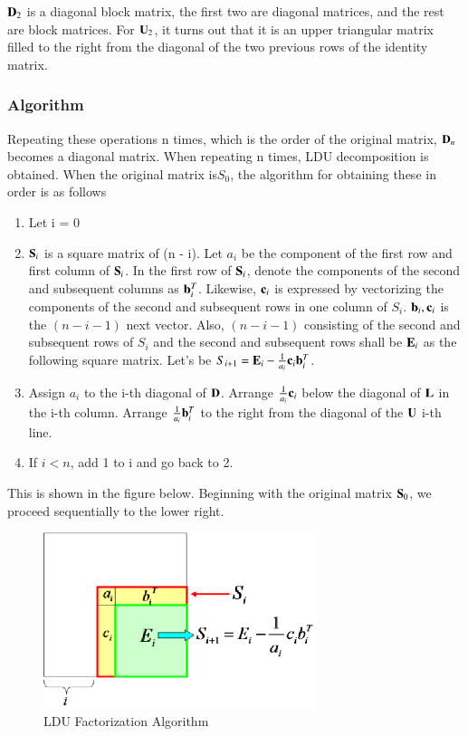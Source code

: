 $\mathbf{D}_2$ is a diagonal block matrix, the first two are diagonal matrices, and the rest are block matrices. For $\mathbf{U}_2$, it turns out that it is an upper triangular matrix filled to the right from the diagonal of the two previous rows of the identity matrix.

\subsubsection{Algorithm}

Repeating these operations n times, which is the order of the original matrix, $\mathbf{D}_n$ becomes a diagonal matrix. When repeating n times, LDU decomposition is obtained.
When the original matrix is ​​$S_0$, the algorithm for obtaining these in order is as follows

\begin {enumerate}
\item Let i = 0
\item $\mathbf{S}_i$ is a square matrix of (n - i). 
%
Let $a_i$ be the component of the first row and first column of $\mathbf{S}_i$. 
%
In the first row of $\mathbf{S}_i$, denote the components of the second and subsequent columns as $\mathbf{b}^T_i$. 
%
Likewise, $\mathbf{c}_i$ is expressed by vectorizing the components of the second and subsequent rows in one column of $S_i$. $\mathbf{b}_i,\mathbf{c}_i$ is the $(n-i-1)$ next vector. 
%
Also, $(n-i-1)$ consisting of the second and subsequent rows of $S_i$ and the second and subsequent rows shall be $\mathbf{E}_i$ as the following square matrix. 
%
Let's be $S_{i+1} = \mathbf{E}_i - \frac{1}{a_i}\mathbf{c}_i\mathbf{b}^T_i$.
\item Assign $a_i$ to the i-th diagonal of $\mathbf{D}$. 
%
Arrange $\frac{1}{a_i}\mathbf{c}_i$ below the diagonal of $\mathbf{L}$ in the i-th column. 
%
Arrange $\frac{1}{a_i}\mathbf{b}^T_i$ to the right from the diagonal of the $\mathbf{U}$ i-th line.
\item If $i<n$, add 1 to i and go back to 2.
\end {enumerate}

This is shown in the figure below. Beginning with the original matrix $\mathbf{S}_0$, we proceed sequentially to the lower right.

\begin{figure}
\begin{center}
\includegraphics[width=80mm]{images/ldu_frac_algorithm.eps}
\caption{LDU Factorization Algorithm}
\end{center}
\end{figure}

